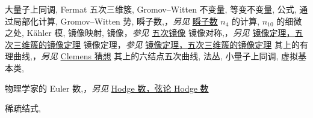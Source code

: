 \begin{theindex}
\subitem \leavevmode\hypertarget{idx:1184}{大量子上同调},\enspace{}
\subitem \leavevmode\hypertarget{idx:1185}{Fermat 五次三维簇},\enspace{}
\subitem \leavevmode\hypertarget{idx:1186}{Gromov--Witten 不变量},\enspace{}
\subsubitem \leavevmode\hypertarget{idx:1187}{等变不变量},\enspace{}
\subsubitem \leavevmode\hypertarget{idx:1188}{公式},\enspace{}
\subsubitem \leavevmode\hypertarget{idx:1189}{通过局部化计算},\enspace{}
\subitem \leavevmode\hypertarget{idx:1190}{Gromov--Witten 势},\enspace{}
\subitem \leavevmode\hypertarget{idx:1191}{瞬子数},\enspace{}，\textit{另见} \hyperlink{idx:0628}{瞬子数}
\subsubitem \leavevmode\hypertarget{idx:1192}{$n_4$ 的计算},\enspace{}
\subsubitem \leavevmode\hypertarget{idx:1193}{$n_{10}$ 的细微之处},\enspace{}
\subitem \leavevmode\hypertarget{idx:1194}{Kähler 模},\enspace{}
\subitem \leavevmode\hypertarget{idx:1195}{镜像映射},\enspace{}
\subitem \leavevmode\hypertarget{idx:1196}{镜像}，\textit{参见} \hyperlink{idx:1164}{五次镜像}
\subitem \leavevmode\hypertarget{idx:1197}{镜像对称},\enspace{}，\textit{另见} \hyperlink{idx:0867}{镜像定理，五次三维簇的镜像定理}
\subitem \leavevmode\hypertarget{idx:1198}{镜像定理}，\textit{参见} \hyperlink{idx:0867}{镜像定理，五次三维簇的镜像定理}
\subitem \leavevmode\hypertarget{idx:1199}{其上的有理曲线},\enspace{}，\textit{另见} \hyperlink{idx:0124}{Clemens 猜想}
\subsubitem \leavevmode\hypertarget{idx:1200}{其上的六结点五次曲线},\enspace{}
\subsubitem \leavevmode\hypertarget{idx:1201}{法丛},\enspace{}
\subitem \leavevmode\hypertarget{idx:1202}{小量子上同调},\enspace{}
\subitem \leavevmode\hypertarget{idx:1203}{虚拟基本类},\enspace{}
\indexspace
\item \leavevmode\hypertarget{idx:1048}{物理学家的 Euler 数},\enspace{}，\textit{另见} \hyperlink{idx:0592}{Hodge 数，弦论 Hodge 数}
\indexspace
\item \leavevmode\hypertarget{idx:1265}{稀疏结式},\enspace{}

\end{theindex}
